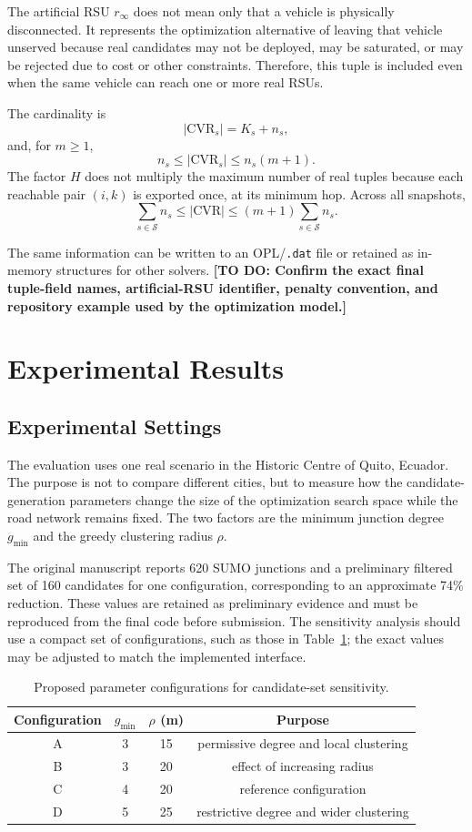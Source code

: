 \documentclass[engproc,proceedingpaper,submit,oneauthor]{Definitions/mdpi}
\newcommand{\todo}[1]{{\color{todored}\textbf{[TO DO: #1]}}}
\newcommand{\CVR}{\mathrm{CVR}}
\begin{document}
The artificial RSU $r_\infty$ does not mean only that a vehicle is physically disconnected. It represents the optimization alternative of leaving that vehicle unserved because real candidates may not be deployed, may be saturated, or may be rejected due to cost or other constraints. Therefore, this tuple is included even when the same vehicle can reach one or more real RSUs.

The cardinality is
\[
|\CVR_s|=K_s+n_s,
\]
and, for $m\ge1$,
\[
n_s\le |\CVR_s|\le n_s(m+1).
\]
The factor $H$ does not multiply the maximum number of real tuples because each reachable pair $(i,k)$ is exported once, at its minimum hop. Across all snapshots,
\[
\sum_{s\in\mathcal S}n_s\le |\CVR|\le(m+1)\sum_{s\in\mathcal S}n_s.
\]

The same information can be written to an OPL/\texttt{.dat} file or retained as in-memory structures for other solvers. \todo{Confirm the exact final tuple-field names, artificial-RSU identifier, penalty convention, and repository example used by the optimization model.}

\section{Experimental Results}\label{sec:results}
\subsection{Experimental Settings}
The evaluation uses one real scenario in the Historic Centre of Quito, Ecuador. The purpose is not to compare different cities, but to measure how the candidate-generation parameters change the size of the optimization search space while the road network remains fixed. The two factors are the minimum junction degree $g_{\min}$ and the greedy clustering radius $\rho$.

The original manuscript reports 620 SUMO junctions and a preliminary filtered set of 160 candidates for one configuration, corresponding to an approximate 74\% reduction. These values are retained as preliminary evidence and must be reproduced from the final code before submission. The sensitivity analysis should use a compact set of configurations, such as those in Table~\ref{tab:configs}; the exact values may be adjusted to match the implemented interface.

\begin{table}[H]
\centering
\caption{Proposed parameter configurations for candidate-set sensitivity.}\label{tab:configs}
\begin{tabular}{cccc}
\toprule
Configuration & $g_{\min}$ & $\rho$ (m) & Purpose\\
\midrule
A & 3 & 15 & permissive degree and local clustering\\
B & 3 & 20 & effect of increasing radius\\
C & 4 & 20 & reference configuration\\
D & 5 & 25 & restrictive degree and wider clustering\\
\bottomrule
\end{tabular}
\end{table}
\end{document}

